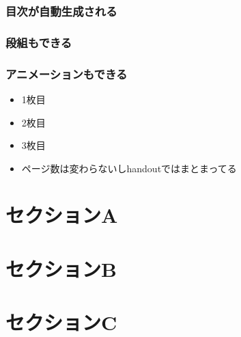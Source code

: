 \documentclass[dvipdfmx]{beamer}
\begin{document}
\frame[plain]{\maketitle}

\begin{frame}{}
  \frametitle{目次が自動生成される}
  \tableofcontents
\end{frame}

\begin{frame}{}
  \frametitle{段組もできる}
    \begin{multicols}{2}
      \tableofcontents[sections={1-2}]
      \columnbreak
      \tableofcontents[sections={3}]
    \end{multicols}
\end{frame}

\begin{frame}{}
  \frametitle{アニメーションもできる}
  \begin{itemize}
    \item 1枚目
    \item 2枚目
    \item 3枚目
    \item ページ数は変わらないしhandoutではまとまってる
  \end{itemize}
\end{frame}

\section{セクションA}

\section{セクションB}

\section{セクションC}

\end{document}
